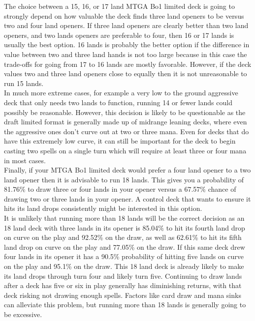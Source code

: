 \documentclass[oneside]{book}   %
\begin{document}
The choice between a 15, 16, or 17 land MTGA Bo1 limited deck is going to strongly depend on how valuable the deck finds three land openers to be versus two and four land openers. If three land openers are clearly better than two land openers, and two lands openers are preferable to four, then 16 or 17 lands is usually the best option. 16 lands is probably the better option if the difference in value between two and three land hands is not too large because in this case the trade-offs for going from 17 to 16 lands are mostly favorable. However, if the deck values two and three land openers close to equally then it is not unreasonable to run 15 lands.\\ 

In much more extreme cases, for example a very low to the ground aggressive deck that only needs two lands to function, running 14 or fewer lands could possibly be reasonable. However, this decision is likely to be questionable as the draft limited format is generally made up of midrange leaning decks, where even the aggressive ones don't curve out at two or three mana. Even for decks that do have this extremely low curve, it can still be important for the deck to begin casting two spells on a single turn which will require at least three or four mana in most cases.\\

Finally, if your MTGA Bo1 limited deck would prefer a four land opener to a two land opener then it is advisable to run 18 lands. This gives you a probability of 81.76\% to draw three or four lands in your opener versus a 67.57\% chance of drawing two or three lands in your opener. A control deck that wants to ensure it hits its land drops consistently might be interested in this option. \\

It is unlikely that running more than 18 lands will be the correct decision as an 18 land deck with three lands in its opener is 85.04\% to hit its fourth land drop on curve on the play and 92.52\% on the draw, as well as 62.61\% to hit its fifth land drop on curve on the play and 77.05\% on the draw. If this same deck drew four lands in its opener it has a 90.5\% probability of hitting five lands on curve on the play and 95.1\% on the draw. This 18 land deck is already likely to make its land drops through turn four and likely turn five. Continuing to draw lands after a deck has five or six in play generally has diminishing returns, with that deck risking not drawing enough spells. Factors like card draw and mana sinks can alleviate this problem, but running more than 18 lands is generally going to be excessive. 
\end{document}
